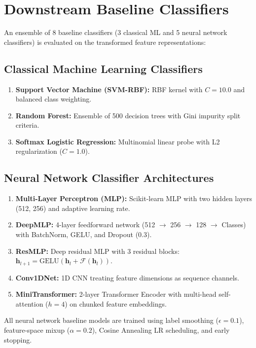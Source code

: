 \section{Downstream Baseline Classifiers}

An ensemble of 8 baseline classifiers (3 classical ML and 5 neural network classifiers) is evaluated on the transformed feature representations:

\subsection{Classical Machine Learning Classifiers}
\begin{enumerate}[leftmargin=*]
    \item \textbf{Support Vector Machine (SVM-RBF):} RBF kernel with $C=10.0$ and balanced class weighting.
    \item \textbf{Random Forest:} Ensemble of 500 decision trees with Gini impurity split criteria.
    \item \textbf{Softmax Logistic Regression:} Multinomial linear probe with L2 regularization ($C=1.0$).
\end{enumerate}

\subsection{Neural Network Classifier Architectures}
\begin{enumerate}[leftmargin=*]
    \item \textbf{Multi-Layer Perceptron (MLP):} Scikit-learn MLP with two hidden layers (512, 256) and adaptive learning rate.
    \item \textbf{DeepMLP:} 4-layer feedforward network (512 $\rightarrow$ 256 $\rightarrow$ 128 $\rightarrow$ Classes) with BatchNorm, GELU, and Dropout (0.3).
    \item \textbf{ResMLP:} Deep residual MLP with 3 residual blocks: $\mathbf{h}_{l+1} = \text{GELU}(\mathbf{h}_l + \mathcal{F}(\mathbf{h}_l))$.
    \item \textbf{Conv1DNet:} 1D CNN treating feature dimensions as sequence channels.
    \item \textbf{MiniTransformer:} 2-layer Transformer Encoder with multi-head self-attention ($h=4$) on chunked feature embeddings.
\end{enumerate}

All neural network baseline models are trained using label smoothing ($\epsilon=0.1$), feature-space mixup ($\alpha=0.2$), Cosine Annealing LR scheduling, and early stopping.

